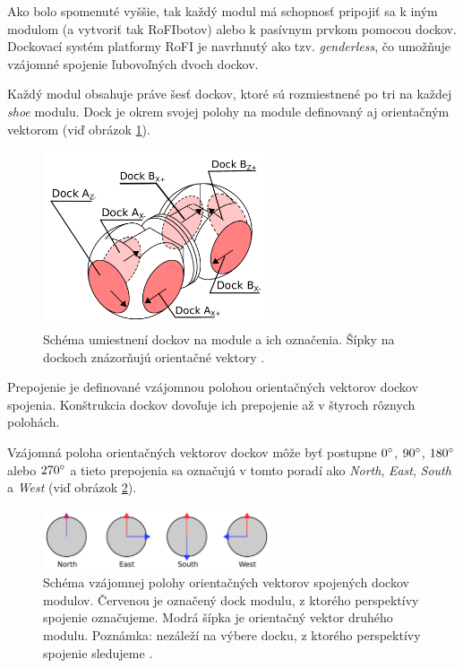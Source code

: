 \documentclass[
  digital, %
  twoside, %
  table,   %
  nolof,     %
  nolot,     %
]{fithesis3}
\begin{document}
Ako bolo spomenuté vyššie, tak každý modul má schopnosť pripojiť sa k iným modulom (a vytvoriť tak RoFIbotov) alebo k pasívnym prvkom pomocou dockov. Dockovací systém platformy RoFI je navrhnutý ako tzv. \textit{genderless}, čo umožňuje vzájomné spojenie ľubovoľných dvoch dockov. 

Každý modul obsahuje práve šesť dockov, ktoré sú rozmiestnené po tri na každej \textit{shoe} modulu. Dock je okrem svojej polohy na module definovaný aj orientačným vektorom (viď obrázok \ref{fig:dock_desc}). 

\begin{figure}[hbt!]
    \centering
    \includegraphics[width=0.6\textwidth]{pictures/dock_desc.pdf}
    \caption[Docky modulu]{Schéma umiestnení dockov na module a ich označenia. Šípky na dockoch znázorňujú orientačné vektory \cite{mrazekMasterThesis}.}
    \label{fig:dock_desc}
\end{figure}

Prepojenie je definované vzájomnou polohou orientačných vektorov dockov spojenia. Konštrukcia dockov dovoľuje ich prepojenie až v štyroch rôznych polohách. 

Vzájomná poloha orientačných vektorov dockov môže byť postupne $0\degree$, $90\degree$, $180\degree$ alebo $270\degree$ a tieto prepojenia sa označujú v tomto poradí ako \textit{North}, \textit{East}, \textit{South} a \textit{West} (viď obrázok \ref{fig:dock_orientation}). 

\begin{figure}[hbt!]
    \centering
    \includegraphics[width=0.6\textwidth]{pictures/dock_orientation.pdf}
    \caption[Poloha prepojenia dockov modulu]{Schéma vzájomnej polohy orientačných vektorov spojených dockov modulov. Červenou je označený dock modulu, z ktorého perspektívy spojenie označujeme. Modrá šípka je orientačný vektor druhého modulu. Poznámka: nezáleží na výbere docku, z ktorého perspektívy spojenie sledujeme \cite{mrazekMasterThesis}.}
    \label{fig:dock_orientation}
\end{figure}
\end{document}
